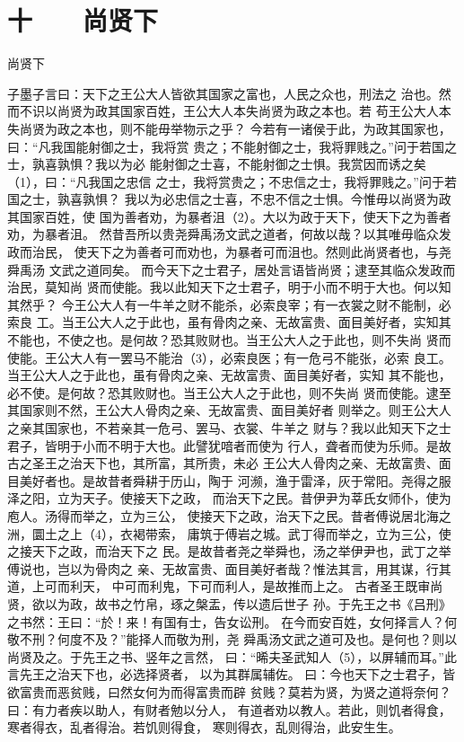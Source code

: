 \documentclass[12pt,UTF8]{ctexbook}
\begin{document}
\chapter{十　　尚贤下}

尚贤下

子墨子言曰：天下之王公大人皆欲其国家之富也，人民之众也，刑法之 
治也。然而不识以尚贤为政其国家百姓，王公大人本失尚贤为政之本也。若 
苟王公大人本失尚贤为政之本也，则不能毋举物示之乎？ 
今若有一诸侯于此，为政其国家也，曰：“凡我国能射御之士，我将赏 
贵之；不能射御之士，我将罪贱之。”问于若国之士，孰喜孰惧？我以为必 
能射御之士喜，不能射御之士惧。我赏因而诱之矣（1），曰：“凡我国之忠信 
之士，我将赏贵之；不忠信之士，我将罪贱之。”问于若国之士，孰喜孰惧？ 
我以为必忠信之士喜，不忠不信之士惧。今惟毋以尚贤为政其国家百姓，使 
国为善者劝，为暴者沮（2）。大以为政于天下，使天下之为善者劝，为暴者沮。 
然昔吾所以贵尧舜禹汤文武之道者，何故以哉？以其唯毋临众发政而治民， 
使天下之为善者可而劝也，为暴者可而沮也。然则此尚贤者也，与尧舜禹汤 
文武之道同矣。 
而今天下之士君子，居处言语皆尚贤；逮至其临众发政而治民，莫知尚 
贤而使能。我以此知天下之士君子，明于小而不明于大也。何以知其然乎？ 
今王公大人有一牛羊之财不能杀，必索良宰；有一衣裳之财不能制，必索良 
工。当王公大人之于此也，虽有骨肉之亲、无故富贵、面目美好者，实知其 
不能也，不使之也。是何故？恐其败财也。当王公大人之于此也，则不失尚 
贤而使能。王公大人有一罢马不能治（3），必索良医；有一危弓不能张，必索 
良工。当王公大人之于此也，虽有骨肉之亲、无故富贵、面目美好者，实知 
其不能也，必不使。是何故？恐其败财也。当王公大人之于此也，则不失尚 
贤而使能。逮至其国家则不然，王公大人骨肉之亲、无故富贵、面目美好者 
则举之。则王公大人之亲其国家也，不若亲其一危弓、罢马、衣裳、牛羊之 
财与？我以此知天下之士君子，皆明于小而不明于大也。此譬犹喑者而使为 
行人，聋者而使为乐师。是故古之圣王之治天下也，其所富，其所贵，未必 
王公大人骨肉之亲、无故富贵、面目美好者也。是故昔者舜耕于历山，陶于 
河濒，渔于雷泽，灰于常阳。尧得之服泽之阳，立为天子。使接天下之政， 
而治天下之民。昔伊尹为莘氏女师仆，使为庖人。汤得而举之，立为三公， 
使接天下之政，治天下之民。昔者傅说居北海之洲，圜土之上（4），衣褐带索， 
庸筑于傅岩之城。武丁得而举之，立为三公，使之接天下之政，而治天下之 
民。是故昔者尧之举舜也，汤之举伊尹也，武丁之举傅说也，岂以为骨肉之 
亲、无故富贵、面目美好者哉？惟法其言，用其谋，行其道，上可而利天， 
中可而利鬼，下可而利人，是故推而上之。 
古者圣王既审尚贤，欲以为政，故书之竹帛，琢之槃盂，传以遗后世子 
孙。于先王之书《吕刑》之书然：王曰：“於！来！有国有士，告女讼刑。 
在今而安百姓，女何择言人？何敬不刑？何度不及？”能择人而敬为刑，尧 
舜禹汤文武之道可及也。是何也？则以尚贤及之。于先王之书、竖年之言然， 
曰：“晞夫圣武知人（5），以屏辅而耳。”此言先王之治天下也，必选择贤者， 
以为其群属辅佐。 
曰：今也天下之士君子，皆欲富贵而恶贫贱，曰然女何为而得富贵而辟 
贫贱？莫若为贤，为贤之道将奈何？曰：有力者疾以助人，有财者勉以分人， 
有道者劝以教人。若此，则饥者得食，寒者得衣，乱者得治。若饥则得食， 
寒则得衣，乱则得治，此安生生。 
\end{document}
